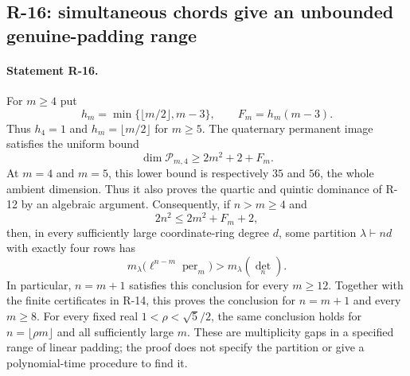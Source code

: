 \subsection{R-16: simultaneous chords give an unbounded genuine-padding range}

\paragraph{Statement R-16.}
For $m\geq4$ put
\[
 h_m=\min\{\lfloor m/2\rfloor,m-3\},\qquad
 F_m=h_m(m-3).
\]
Thus $h_4=1$ and $h_m=\lfloor m/2\rfloor$ for $m\geq5$.
The quaternary permanent image satisfies the uniform bound
\begin{equation}\label{R16:dimension}
 \dim\mathcal P_{m,4}\geq 2m^2+2+F_m.
\end{equation}
At $m=4$ and $m=5$, this lower bound is respectively $35$ and
$56$, the whole ambient dimension. Thus it also proves the
quartic and quintic dominance of R-12 by an algebraic argument.
Consequently, if $n>m\geq4$ and
\begin{equation}\label{R16:paddingrange}
 2n^2\leq2m^2+F_m+2,
\end{equation}
then, in every sufficiently large coordinate-ring degree $d$,
some partition $\lambda\vdash nd$ with exactly four rows has
\[
 m_\lambda\bigl(\ell^{n-m}\operatorname{per}_m\bigr)
   >m_\lambda(\det_n).
\]
In particular, $n=m+1$ satisfies this conclusion for every
$m\geq12$. Together with the finite certificates in R-14,
this proves the conclusion for $n=m+1$ and every $m\geq8$.
For every fixed real $1<\rho<\sqrt5/2$, the same conclusion
holds for $n=\lfloor\rho m\rfloor$ and all sufficiently large
$m$. These are multiplicity gaps in a specified range of
linear padding; the proof does not specify the partition or
give a polynomial-time procedure to find it.


